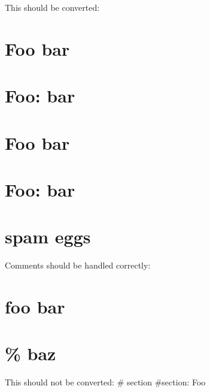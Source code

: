 This should be converted:
\section{Foo bar}
\section{Foo: bar}
\section[Foo bar]{Foo bar}
\section[Foo: bar]{Foo: bar}

\section*{spam eggs}

Comments should be handled correctly:
\section{foo bar} %
\section{\% baz} %

This should not be converted:
# section
#section: Foo
